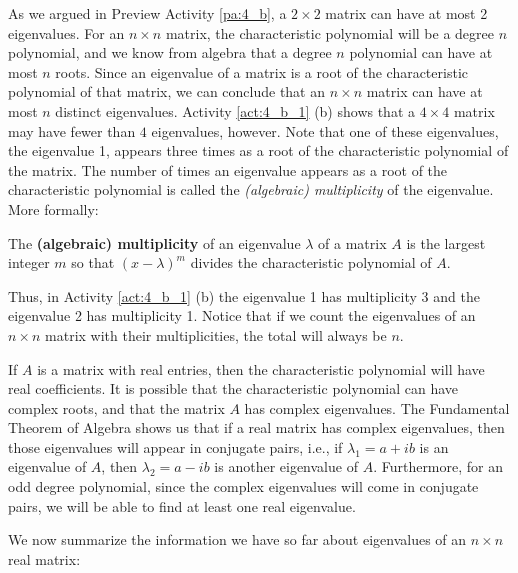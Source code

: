 As we argued in Preview Activity \ref{pa:4_b}, a $2 \times 2$ matrix can have at most 2 eigenvalues. For an $n \times n$ matrix, the characteristic polynomial will be a degree $n$ polynomial, and we know from algebra that a degree $n$ polynomial can have at most $n$ roots. Since an eigenvalue of a matrix is a root of the characteristic polynomial of that matrix, we can conclude that an $n \times n$ matrix can have at most $n$ distinct eigenvalues. Activity \ref{act:4_b_1} (b) shows that a $4 \times 4$ matrix may have fewer than $4$ eigenvalues, however. Note that one of these eigenvalues, the eigenvalue 1, appears three times as a root of the characteristic polynomial of the matrix. The number of times an eigenvalue appears as a root of the characteristic polynomial is called the \emph{(algebraic) multiplicity} of the eigenvalue. More formally:



\begin{definition} The \textbf{(algebraic) multiplicity} of an eigenvalue $\lambda$ of a matrix $A$ is the largest integer $m$ so that $(x-\lambda)^m$ divides the characteristic polynomial of $A$.
\end{definition}



Thus, in Activity \ref{act:4_b_1} (b) the eigenvalue 1 has multiplicity 3 and the eigenvalue 2 has multiplicity 1. Notice that if we count the eigenvalues of an $n \times n$ matrix with their multiplicities, the total will always be $n$.

 

If $A$ is a matrix with real entries, then the characteristic polynomial will have real coefficients. It is possible that the characteristic polynomial can have complex roots, and that the matrix $A$ has complex eigenvalues. The Fundamental Theorem of Algebra shows us that if a real matrix has complex eigenvalues, then those eigenvalues will appear in conjugate pairs, i.e., if $\lambda_1=a+ib$ is an eigenvalue of $A$, then $\lambda_2=a-ib$ is another eigenvalue of $A$. Furthermore, for an odd degree polynomial, since the complex eigenvalues will come in conjugate pairs, we will be able to find at least one real eigenvalue.



We now summarize the information we have so far about eigenvalues of an $n\times n$ real matrix:

